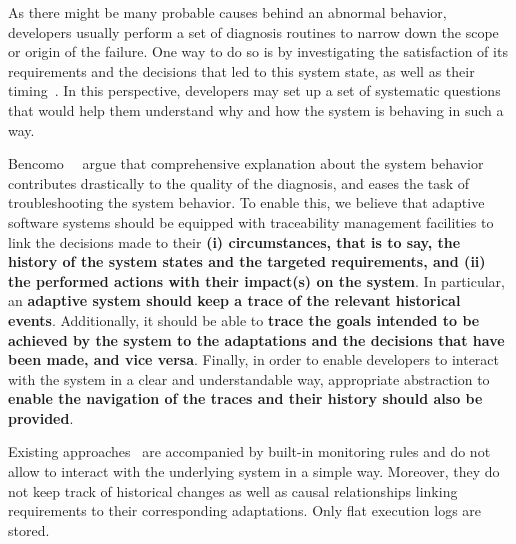 As there might be many probable causes behind an abnormal behavior, developers usually perform a set of diagnosis routines to narrow down the scope or origin of the failure. One way to do so is by investigating the satisfaction of its requirements and the decisions that led to this system state, as well as their timing~\cite{DBLP:conf/iceccs/BencomoWSW12}.  
In this perspective, developers may set up a set of systematic questions that would help them understand why and how the system is behaving in such a way. 

Bencomo~\etal~\cite{DBLP:conf/iceccs/BencomoWSW12} argue that comprehensive explanation about the system behavior contributes drastically to the quality of the diagnosis, and eases the task of troubleshooting the system behavior. To enable this, we believe that adaptive software systems should be equipped with traceability management facilities to link the decisions made to their \textbf{(i) circumstances, that is to say, the history of the system states and the targeted requirements, and (ii) the performed actions with their impact(s) on the system}.
In particular, an \textbf{adaptive system should keep a trace of the relevant historical events}.
Additionally, it should be able to \textbf{trace the goals intended to be achieved by the system to the adaptations and the decisions that have been made, and vice versa}. 
Finally, in order to enable developers to interact with the system in a clear and understandable way, appropriate abstraction to \textbf{enable the navigation of the traces and their history should also be provided}. %

Existing approaches~\cite{hassel13,heinrich14,ehlers11,DBLP:conf/icse/MendoncaAR14,DBLP:conf/icse/CasanovaGSA14,DBLP:conf/icse/IftikharW14a} are accompanied by built-in monitoring rules and do not allow to interact with the underlying system in a simple way. 
Moreover, they do not keep track of historical changes as well as causal relationships linking requirements to their corresponding adaptations. Only flat execution logs are stored. 

